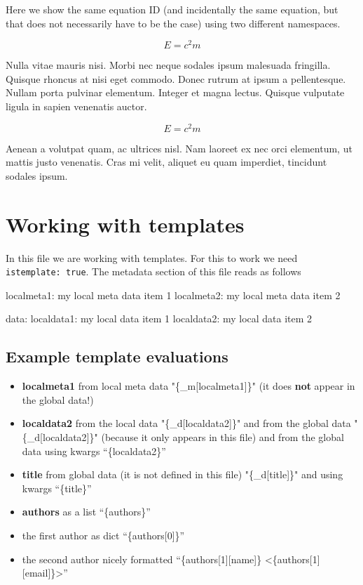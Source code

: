 \documentclass[11pt]{article}
\begin{document}
Here we show the same equation ID (and incidentally the same equation,
but that does not necessarily have to be the case) using two different
namespaces.

\[
E = c^{2} m
\]

Nulla vitae mauris nisi. Morbi nec neque sodales ipsum malesuada
fringilla. Quisque rhoncus at nisi eget commodo. Donec rutrum at ipsum a
pellentesque. Nullam porta pulvinar elementum. Integer et magna lectus.
Quisque vulputate ligula in sapien venenatis auctor.

\[
E = c^{2} m
\]

Aenean a volutpat quam, ac ultrices nisl. Nam laoreet ex nec orci
elementum, ut mattis justo venenatis. Cras mi velit, aliquet eu quam
imperdiet, tincidunt sodales ipsum.


\hypertarget{working-with-templates}{%
\section{Working with templates}\label{working-with-templates}}

In this file we are working with templates. For this to work we need
\texttt{istemplate:\ true}. The metadata section of this file reads as
follows

localmeta1: my local meta data item 1 localmeta2: my local meta data
item 2

data: localdata1: my local data item 1 localdata2: my local data item 2

\hypertarget{example-template-evaluations}{%
\subsection{Example template
evaluations}\label{example-template-evaluations}}

\begin{itemize}
\item
  \textbf{localmeta1} from local meta data "\{\_m{[}localmeta1{]}\}" (it
  does \textbf{not} appear in the global data!)
\item
  \textbf{localdata2} from the local data "\{\_d{[}localdata2{]}\}" and
  from the global data "\{\_d{[}localdata2{]}\}" (because it only
  appears in this file) and from the global data using kwargs
  ``\{localdata2\}''
\item
  \textbf{title} from global data (it is not defined in this file)
  "\{\_d{[}title{]}\}" and using kwargs ``\{title\}''
\item
  \textbf{authors} as a list ``\{authors\}''
\item
  the first author as dict ``\{authors{[}0{]}\}''
\item
  the second author nicely formatted ``\{authors{[}1{]}{[}name{]}\}
  \textless\{authors{[}1{]}{[}email{]}\}\textgreater{}''
\end{itemize}
\end{document}
